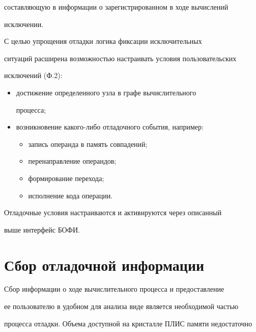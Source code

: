 со\-став\-ля\-ющую в информации о зарегистрированном в ходе вычислений 


исключении.


      


      С целью упрощения отладки логика фиксации исключительных 


ситуаций расширена возможностью настраивать условия пользовательских 


исключений (Ф.2):


      \begin{itemize}


\item достижение определенного узла в графе вычислительного 


процесса;


\item возникновение какого-либо отладочного события, например:


\begin{itemize}


\item запись операнда в память совпадений;


\item перенаправление операндов;


\item формирование перехода;


\item исполнение кода операции. 


\end{itemize}


\end{itemize}


      


      Отладочные условия настраиваются и активируются через описанный 


выше интерфейс БОФИ.


\section{Сбор отладочной информации}


      


      Сбор информации о ходе вычислительного процесса и предоставление 


ее пользователю в удобном для анализа виде является необходимой частью 


процесса отладки. Объема доступной на кристалле ПЛИС памяти недостаточно 


